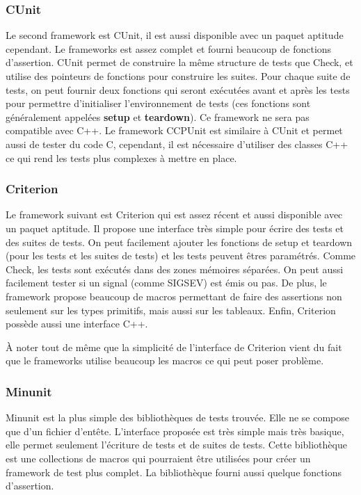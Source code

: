 \documentclass[a4paper]{article}
\begin{document}
\subsubsection*{CUnit}

Le second framework est CUnit, il est aussi disponible avec un paquet aptitude
cependant. Le frameworks est assez complet et fourni beaucoup de fonctions
d'assertion. CUnit permet de construire la même structure de tests que Check, et
utilise des pointeurs de fonctions pour construire les suites. Pour chaque suite
de tests, on peut fournir deux fonctions qui seront exécutées avant et après les
tests pour permettre d'initialiser l'environnement de tests (ces fonctions sont
généralement appelées \textbf{setup} et \textbf{teardown}). Ce framework ne sera
pas compatible avec C++. Le framework CCPUnit est similaire à CUnit et permet
aussi de tester du code C, cependant, il est nécessaire d'utiliser des classes
C++ ce qui rend les tests plus complexes à mettre en place.

\subsubsection*{Criterion}

Le framework suivant est Criterion qui est assez récent et aussi disponible avec
un paquet aptitude. Il propose une interface très simple pour écrire des tests
et des suites de tests. On peut facilement ajouter les fonctions de setup et
teardown (pour les tests et les suites de tests) et les tests peuvent êtres
paramétrés. Comme Check, les tests sont exécutés dans des zones mémoires
séparées. On peut aussi facilement tester si un signal (comme SIGSEV) est émis
ou pas. De plus, le framework propose beaucoup de macros permettant de faire des
assertions non seulement sur les types primitifs, mais aussi sur les tableaux.
Enfin, Criterion possède aussi une interface C++.

À noter tout de même que la simplicité de l'interface de Criterion vient du fait
que le frameworks utilise beaucoup les macros ce qui peut poser problème.

\subsubsection*{Minunit}

Minunit est la plus simple des bibliothèques de tests trouvée. Elle ne se
compose que d'un fichier d'entête. L'interface proposée est très simple mais
très basique, elle permet seulement l'écriture de tests et de suites de tests.
Cette bibliothèque est une collections de macros qui pourraient être utilisées
pour créer un framework de test plus complet. La bibliothèque fourni aussi
quelque fonctions d'assertion.
\end{document}
